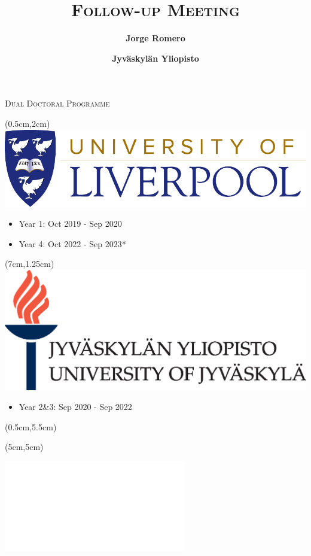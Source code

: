 \documentclass[9pt]{beamer}
\title{\textsc{Follow-up Meeting}}
\subtitle{\textbf{Jorge Romero}}
\author{\textbf{Jyväskylän Yliopisto}}
\institute{5. huhtikuuta 2021}
\begin{document}
\titlepage

\begin{frame}{\textsc{Dual Doctoral Programme}}
    \begin{textblock*}{5cm}(0.5cm,2cm)
        \centering
        \includegraphics[width=\textwidth]{liverpool-logo.pdf}
        \begin{itemize}
            \item<2-> Year 1: Oct 2019 - Sep 2020
            \item<4-> Year 4: Oct 2022 - Sep 2023*
        \end{itemize}
    \end{textblock*}
    \begin{textblock*}{5cm}(7cm,1.25cm)
        \centering
        \includegraphics[width=\textwidth]{jyu-vaaka-kaksikielinen.eps}
        \begin{itemize}
            \item<3-> Year 2\&3: Sep 2020 - Sep 2022             
        \end{itemize}
    \end{textblock*}
    
    \begin{textblock*}{5cm}(0.5cm,5.5cm)


    \end{textblock*}

    \begin{textblock*}{5cm}(5cm,5cm)
        
            \includegraphics<5->[scale=0.4]{ROI.pdf}

    \end{textblock*}
\end{frame}
\end{document}

